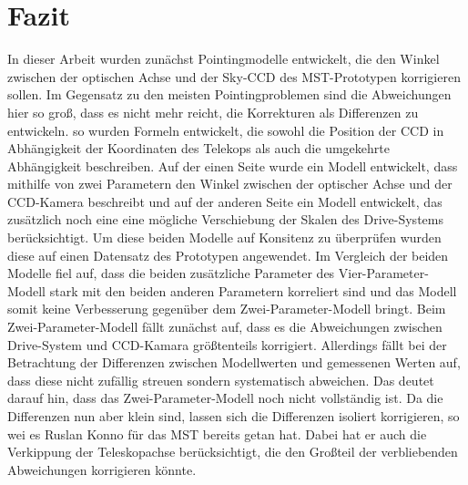 \chapter{Fazit}
In dieser Arbeit wurden zunächst Pointingmodelle entwickelt, die den Winkel zwischen der optischen Achse und der Sky-CCD des MST-Prototypen korrigieren sollen. Im Gegensatz zu den meisten Pointingproblemen sind die Abweichungen hier so groß, dass es nicht mehr reicht, die Korrekturen als Differenzen zu entwickeln. so wurden Formeln entwickelt, die sowohl die Position der CCD in Abhängigkeit der Koordinaten des Telekops als auch die umgekehrte Abhängigkeit beschreiben. Auf der einen Seite wurde ein Modell entwickelt, dass mithilfe von zwei Parametern den Winkel zwischen der optischer Achse und der CCD-Kamera beschreibt und auf der anderen Seite ein Modell entwickelt, das zusätzlich noch eine eine mögliche Verschiebung der Skalen des Drive-Systems berücksichtigt. Um diese beiden Modelle auf Konsitenz zu überprüfen wurden diese auf einen Datensatz des Prototypen angewendet. Im Vergleich der beiden Modelle fiel auf, dass die beiden zusätzliche Parameter des Vier-Parameter-Modell stark mit den beiden anderen Parametern korreliert sind und das Modell somit keine Verbesserung gegenüber dem Zwei-Parameter-Modell bringt. Beim Zwei-Parameter-Modell fällt zunächst auf, dass es die Abweichungen zwischen Drive-System und CCD-Kamara größtenteils korrigiert. Allerdings fällt bei der Betrachtung der Differenzen zwischen Modellwerten und gemessenen Werten auf, dass diese nicht zufällig streuen sondern systematisch abweichen. Das deutet darauf hin, dass das Zwei-Parameter-Modell noch nicht vollständig ist. Da die Differenzen nun aber klein sind, lassen sich die Differenzen isoliert korrigieren, so wei es Ruslan Konno \cite{Ruslan} für das MST bereits getan hat. Dabei hat er auch die Verkippung der Teleskopachse berücksichtigt, die den Großteil der verbliebenden Abweichungen korrigieren könnte.